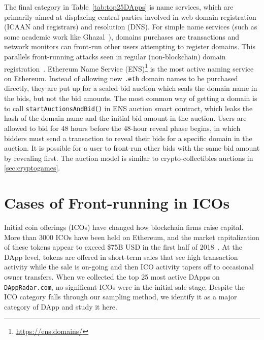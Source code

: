 The final category in Table~\ref{tab:top25DApps} is name services, which are primarily aimed at displacing central parties involved in web domain registration (\eg ICAAN and registrars) and resolution (\eg DNS). For simple name services (such as some academic work like Ghazal~\cite{moosavighazal}), domains purchases are transactions and network monitors can front-run other users attempting to register domains. This parallels front-running attacks seen in regular (non-blockchain) domain registration~\cite{sac022en33:online}. \textsf{Ethereum Name Service (ENS)}\footnote{\url{https://ens.domains/}} is the most active naming service on Ethereum. Instead of allowing new \texttt{.eth} domain names to be purchased directly, they are put up for a sealed bid auction which seals the domain name in the bids, but not the bid amounts. The most common way of getting a domain is to call \texttt{startAuctionsAndBid()} in ENS auction smart contract, which leaks the hash of the domain name and the initial bid amount in the auction. Users are allowed to bid for 48 hours before the 48-hour reveal phase begins, in which bidders must send a transaction to reveal their bids for a specific domain in the auction. It is possible for a user to front-run other bids with the same bid amount by revealing first. The auction model is similar to crypto-collectibles auctions in \ref{sec:cryptogames}.


\section{Cases of Front-running in ICOs}  \label{sec:ICOsfrontrunning}

Initial coin offerings (ICOs) have changed how blockchain firms raise capital. More than 3000 ICOs have been held on Ethereum, and the market capitalization of these tokens appear to exceed \$75B USD in the first half of 2018~\cite{zetzsche2018ico}. At the DApp level, tokens are offered in short-term sales that see high transaction activity while the sale is on-going and then ICO activity tapers off to occasional owner transfers. When we collected the top 25 most active DApps on \texttt{DAppRadar.com}, no significant ICOs were in the initial sale stage. Despite the ICO category falls through our sampling method, we identify it as a major category of DApp and study it here.

